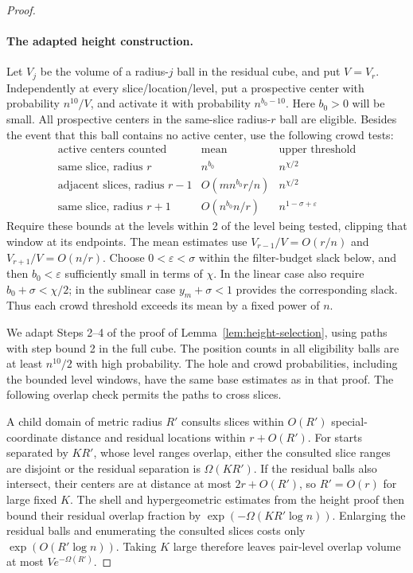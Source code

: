 \begin{proof}
\paragraph{The adapted height construction.}
Let \(V_j\) be the volume of a radius-\(j\) ball in the residual cube, and put \(V=V_r\). Independently at every slice/location/level, put a prospective center with probability \(n^{10}/V\), and activate it with probability \(n^{b_0-10}\). Here \(b_0>0\) will be small. All prospective centers in the same-slice radius-\(r\) ball are eligible. Besides the event that this ball contains no active center, use the following crowd tests:
\[
\begin{array}{c|c|c}
 \text{active centers counted}&\text{mean}&\text{upper threshold}\\ \hline
 \text{same slice, radius }r&n^{b_0}&n^{\chi/2}\\
 \text{adjacent slices, radius }r-1&O(mn^{b_0}r/n)&n^{\chi/2}\\
 \text{same slice, radius }r+1&O(n^{b_0}n/r)&n^{1-\sigma+\varepsilon}
\end{array}
\]
Require these bounds at the levels within 2 of the level being tested, clipping that window at its endpoints. The mean estimates use \(V_{r-1}/V=O(r/n)\) and \(V_{r+1}/V=O(n/r)\). Choose \(0<\varepsilon<\sigma\) within the filter-budget slack below, and then \(b_0<\varepsilon\) sufficiently small in terms of \(\chi\). In the linear case also require \(b_0+\sigma<\chi/2\); in the sublinear case \(y_m+\sigma<1\) provides the corresponding slack. Thus each crowd threshold exceeds its mean by a fixed power of \(n\).

We adapt Steps 2--4 of the proof of Lemma~\ref{lem:height-selection}, using paths with step bound 2 in the full cube. The position counts in all eligibility balls are at least \(n^{10}/2\) with high probability. The hole and crowd probabilities, including the bounded level windows, have the same base estimates as in that proof. The following overlap check permits the paths to cross slices.

A child domain of metric radius \(R'\) consults slices within \(O(R')\) special-coordinate distance and residual locations within \(r+O(R')\). For starts separated by \(KR'\), whose level ranges overlap, either the consulted slice ranges are disjoint or the residual separation is \(\Omega(KR')\). If the residual balls also intersect, their centers are at distance at most \(2r+O(R')\), so \(R'=O(r)\) for large fixed \(K\). The shell and hypergeometric estimates from the height proof then bound their residual overlap fraction by
\(\exp(-\Omega(KR'\log n))\).
Enlarging the residual balls and enumerating the consulted slices costs only \(\exp(O(R'\log n))\). Taking \(K\) large therefore leaves pair-level overlap volume at most \(Ve^{-\Omega(R')}\).


\end{proof}
